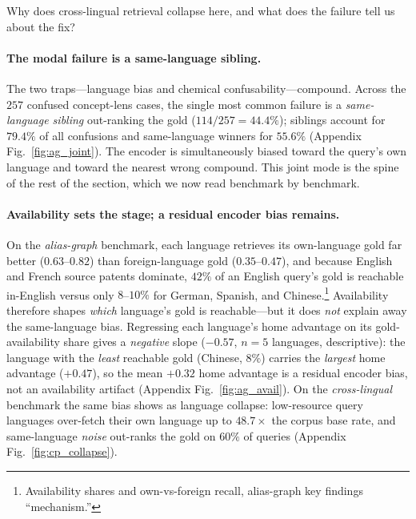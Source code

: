 \documentclass[11pt]{article}
\begin{document}
Why does cross-lingual retrieval collapse here, and what does the failure tell
us about the fix?

\paragraph{The modal failure is a same-language sibling.}
The two traps---language bias and chemical confusability---compound. Across the
$257$ confused concept-lens cases, the single most common failure is a
\emph{same-language sibling} out-ranking the gold ($114/257 = 44.4\%$); siblings
account for $79.4\%$ of all confusions and same-language winners for $55.6\%$
(Appendix Fig.~\ref{fig:ag_joint}). The encoder is simultaneously biased toward the
query's own language and toward the nearest wrong compound. This joint mode is
the spine of the rest of the section, which we now read benchmark by benchmark.

\paragraph{Availability sets the stage; a residual encoder bias remains.}
On the \emph{alias-graph} benchmark, each language retrieves its own-language
gold far better ($0.63$--$0.82$) than foreign-language gold ($0.35$--$0.47$), and
because English and French source patents dominate, $42\%$ of an English query's
gold is reachable in-English versus only $8$--$10\%$ for German, Spanish, and
Chinese.\footnote{Availability shares and own-vs-foreign recall, alias-graph key
findings ``mechanism.''} Availability therefore shapes \emph{which} language's
gold is reachable---but it does \emph{not} explain away the same-language bias.
Regressing each language's home advantage on its gold-availability share gives a
\emph{negative} slope ($-0.57$, $n{=}5$ languages, descriptive): the language
with the \emph{least} reachable gold (Chinese, $8\%$) carries the \emph{largest}
home advantage ($+0.47$), so the mean $+0.32$ home advantage is a residual
encoder bias, not an availability artifact (Appendix Fig.~\ref{fig:ag_avail}). On the
\emph{cross-lingual} benchmark the same bias shows as language collapse:
low-resource query languages over-fetch their own language up to $48.7\times$ the
corpus base rate, and same-language \emph{noise} out-ranks the gold on $60\%$ of
queries (Appendix Fig.~\ref{fig:cp_collapse}).
\end{document}
